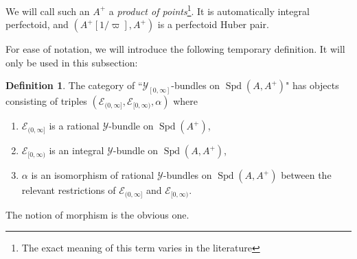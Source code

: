 \documentclass[10pt,twoside]{article}
\numberwithin{equation}{section}
\theoremstyle{plain}
\theoremstyle{definition}
\newtheorem{mydef}[mythm]{Definition}
\DeclareMathOperator{\Spd}{Spd}
\newcommand{\MCE}{\mathcal{E}}
\newcommand{\MCY}{\mathcal{Y}}
\begin{document}
We will call such an \(A^+\) a \emph{product of points}\footnote{The exact meaning of this term varies in the literature}. It is automatically integral perfectoid, and \((A^+[1/\varpi],A^+)\) is a perfectoid Huber pair.\par



For ease of notation, we will introduce the following temporary definition. It will only be used in this subsection:

\begin{mydef}
The category of ``\(\MCY_{[0,\infty]}\)-bundles on \(\Spd(A,A^+)\)" has objects consisting of triples \((\MCE_{(0,\infty]},\MCE_{[0,\infty)},\alpha)\) where 
\begin{enumerate}
    \item \(\MCE_{(0,\infty]}\) is a rational \(\MCY\)-bundle on \(\Spd(A^+)\),
    \item \(\MCE_{[0,\infty)}\) is an integral \(\MCY\)-bundle on \(\Spd(A,A^+)\),
    \item \(\alpha\) is an isomorphism of rational \(\MCY\)-bundles on \(\Spd(A,A^+)\) between the relevant restrictions of \(\MCE_{(0,\infty]}\) and \(\MCE_{[0,\infty)}\).
\end{enumerate}
The notion of morphism is the obvious one.
\end{mydef}
\end{document}
